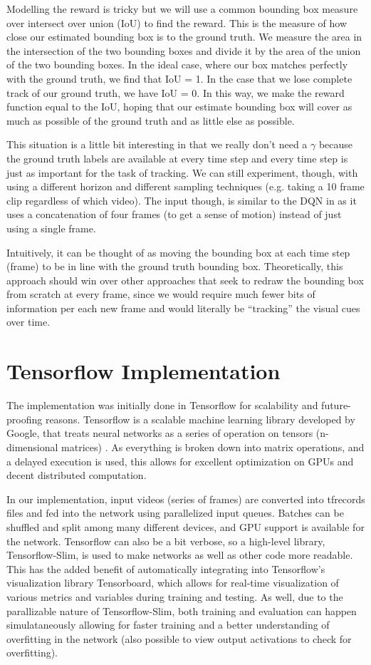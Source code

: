 \documentclass[letterpaper,12pt,titlepage,oneside,final]{book}
\begin{document}
Modelling the reward is tricky but we will use a common bounding box measure over intersect over union (IoU) to find the reward. This is the measure of how close our estimated bounding box is to the ground truth. We measure the area in the intersection of the two bounding boxes and divide it by the area of the union of the two bounding boxes. In the ideal case, where our box matches perfectly with the ground truth, we find that IoU = 1. In the case that we lose complete track of our ground truth, we have IoU = 0. In this way, we make the reward function equal to the IoU, hoping that our estimate bounding box will cover as much as possible of the ground truth and as little else as possible.

This situation is a little bit interesting in that we really don't need a $\gamma$ because the ground truth labels are available at every time step and every time step is just as important for the task of tracking. We can still experiment, though, with using a different horizon and different sampling techniques (e.g. taking a 10 frame clip regardless of which video). The input though, is similar to the DQN in \cite{atari-dqn} as it uses a concatenation of four frames (to get a sense of motion) instead of just using a single frame.

Intuitively, it can be thought of as moving the bounding box at each time step (frame) to be in line with the ground truth bounding box. Theoretically, this approach should win over other approaches that seek to redraw the bounding box from scratch at every frame, since we would require much fewer bits of information per each new frame and would literally be ``tracking'' the visual cues over time.

\section{Tensorflow Implementation}
The implementation was initially done in Tensorflow for scalability and future-proofing reasons. Tensorflow is a scalable machine learning library developed by Google, that treats neural networks as a series of operation on tensors (n-dimensional matrices) \cite{tensorflow}. As everything is broken down into matrix operations, and a delayed execution is used, this allows for excellent optimization on GPUs and decent distributed computation. 

In our implementation, input videos (series of frames) are converted into tfrecords files and fed into the network using parallelized input queues. Batches can be shuffled and split among many different devices, and GPU support is available for the network. Tensorflow can also be a bit verbose, so a high-level library, Tensorflow-Slim, is used to make networks as well as other code more readable. This has the added benefit of automatically integrating into Tensorflow's visualization library Tensorboard, which allows for real-time visualization of various metrics and variables during training and testing. As well, due to the parallizable nature of Tensorflow-Slim, both training and evaluation can happen simulataneously allowing for faster training and a better understanding of overfitting in the network (also possible to view output activations to check for overfitting).
\end{document}
